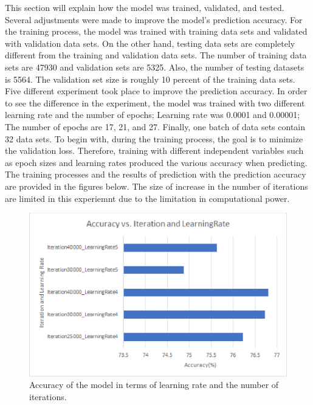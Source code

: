 This section will explain how the model was trained, validated, and tested. Several adjustments were
made to improve the model's prediction accuracy. For the training process, the model was trained with
training data sets and validated with validation data sets. On the other hand, testing data sets are
completely different from the training and validation data sets.
The number of training data sets are 47930 and validation sets are 5325. Also, the number of testing
datasets is 5564. The validation set size is
roughly 10 percent of the training data sets. Five different experiment took place to improve the
prediction accuracy. In order to see the difference in the experiment, the model was trained with two
different learning rate and the number of epochs; Learning rate was 0.0001 and 0.00001; The number of
epochs are 17, 21, and 27. Finally, one batch of data sets contain 32 data sets.
\newline
\newline
\indent
To begin with, during the training process, the goal is to minimize the validation loss. Therefore,
training with different independent variables such as epoch sizes and learning rates produced the various
accuracy when predicting. The training processes and the results of prediction with the prediction accuracy are
provided in the figures below. The size of increase in the number of iterations are limited in this experiemnt
due to the limitation in computational power.
\newline

    \begin{figure}
        \includegraphics[width=\textwidth, scale=0.25]{Acc.eps}
        \caption{Accuracy of the model in terms of learning rate and the number of iterations.}
        \label{Figure2}
    \end{figure}


